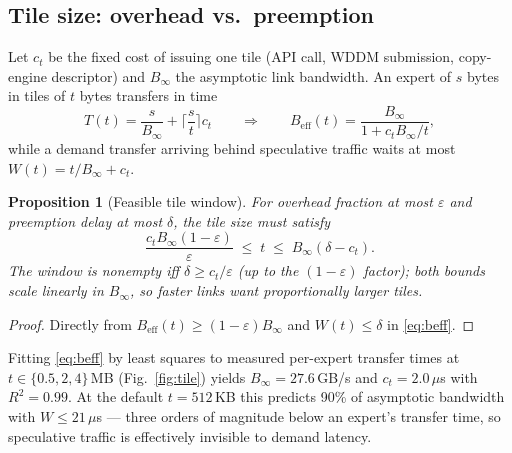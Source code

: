 \documentclass[11pt]{article}
\newtheorem{proposition}[theorem]{Proposition}
\theoremstyle{definition}
\theoremstyle{remark}
\begin{document}
\subsection{Tile size: overhead vs.\ preemption}\label{sec:tilesize}
Let $c_t$ be the fixed cost of issuing one tile (API call, WDDM submission,
copy-engine descriptor) and $B_\infty$ the asymptotic link bandwidth. An
expert of $s$ bytes in tiles of $t$ bytes transfers in time
\begin{equation}
T(t) = \frac{s}{B_\infty} + \Big\lceil \frac{s}{t} \Big\rceil c_t
\qquad\Longrightarrow\qquad
B_{\mathrm{eff}}(t) = \frac{B_\infty}{1 + c_t B_\infty / t},
\label{eq:beff}
\end{equation}
while a demand transfer arriving behind speculative traffic waits at most
$W(t) = t/B_\infty + c_t$.

\begin{proposition}[Feasible tile window]\label{prop:tile}
For overhead fraction at most $\varepsilon$ and preemption delay at most
$\delta$, the tile size must satisfy
\begin{equation}
\frac{c_t B_\infty (1-\varepsilon)}{\varepsilon} \;\le\; t \;\le\;
B_\infty(\delta - c_t).
\end{equation}
The window is nonempty iff $\delta \ge c_t/\varepsilon$ (up to the
$(1{-}\varepsilon)$ factor); both bounds scale linearly in $B_\infty$, so
faster links want proportionally larger tiles.
\end{proposition}
\begin{proof}
Directly from $B_{\mathrm{eff}}(t) \ge (1-\varepsilon)B_\infty$ and
$W(t)\le\delta$ in \eqref{eq:beff}.
\end{proof}

Fitting \eqref{eq:beff} by least squares to measured per-expert transfer
times at $t \in \{0.5, 2, 4\}$\,MB (Fig.~\ref{fig:tile}) yields $B_\infty =
27.6$\,GB/s and $c_t = 2.0\,\mu$s with $R^2 = 0.99$. At the default
$t=512$\,KB this predicts 90\% of asymptotic bandwidth with $W \le 21\,\mu$s
--- three orders of magnitude below an expert's transfer time, so
speculative traffic is effectively invisible to demand latency.
\end{document}
